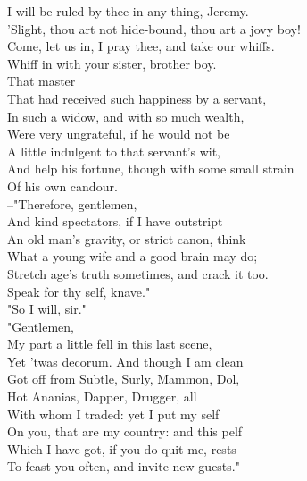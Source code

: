 \documentclass{memoir}
\begin{document}
\begin{drama*}
 I will be ruled by thee in any thing, Jeremy.\\
\kastrilspeaks  'Slight, thou art not hide-bound, thou art a jovy boy!\\
 Come, let us in, I pray thee, and take our whiffs.\\
\lovewitspeaks  Whiff in with your sister, brother boy.\\
 That master\\
 That had received such happiness by a servant,\\
 In such a widow, and with so much wealth,\\
 Were very ungrateful, if he would not be\\
 A little indulgent to that servant's wit,\\
 And help his fortune, though with some small strain\\
 Of his own candour.\\
 --"Therefore, gentlemen,\\
 And kind spectators, if I have outstript\\
 An old man's gravity, or strict canon, think\\
 What a young wife and a good brain may do;\\
 Stretch age's truth sometimes, and crack it too.\\
 Speak for thy self, knave."\\
\facespeaks {} "So I will, sir."\\
 "Gentlemen,\\
 My part a little fell in this last scene,\\
 Yet 'twas decorum. And though I am clean\\
 Got off from Subtle, Surly, Mammon, Dol,\\
 Hot Ananias, Dapper, Drugger, all\\
 With whom I traded: yet I put my self\\
 On you, that are my country: and this pelf\\
 Which I have got, if you do quit me, rests\\
 To feast you often, and invite new guests."\\

\end{drama*}
\end{document}

